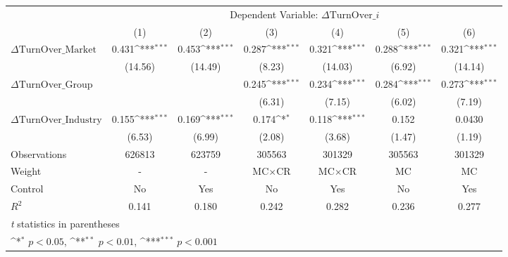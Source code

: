 {
\def\sym#1{\ifmmode^{#1}\else\(^{#1}\)\fi}
\begin{tabular}{l*{6}{c}}
\hline\hline
                    &\multicolumn{6}{c}{Dependent Variable: $\Delta \text{TurnOver}\_{i} $ }                                                             \\\cmidrule(lr){2-7}
                    &\multicolumn{1}{c}{(1)}         &\multicolumn{1}{c}{(2)}         &\multicolumn{1}{c}{(3)}         &\multicolumn{1}{c}{(4)}         &\multicolumn{1}{c}{(5)}         &\multicolumn{1}{c}{(6)}         \\
\hline
 $ \Delta \text{TurnOver}\_{\text{Market}} $ &       0.431\sym{***}&       0.453\sym{***}&       0.287\sym{***}&       0.321\sym{***}&       0.288\sym{***}&       0.321\sym{***}\\
                    &     (14.56)         &     (14.49)         &      (8.23)         &     (14.03)         &      (6.92)         &     (14.14)         \\
[1em]
 $ \Delta \text{TurnOver}\_{\text{Group}} $ &                     &                     &       0.245\sym{***}&       0.234\sym{***}&       0.284\sym{***}&       0.273\sym{***}\\
                    &                     &                     &      (6.31)         &      (7.15)         &      (6.02)         &      (7.19)         \\
[1em]
 $ \Delta \text{TurnOver}\_{\text{Industry}} $ &       0.155\sym{***}&       0.169\sym{***}&       0.174\sym{*}  &       0.118\sym{***}&       0.152         &      0.0430         \\
                    &      (6.53)         &      (6.99)         &      (2.08)         &      (3.68)         &      (1.47)         &      (1.19)         \\
\hline
Observations        &      626813         &      623759         &      305563         &      301329         &      305563         &      301329         \\
Weight              &           -         &           -         & $ \text{MC} \times \text{CR} $          & $ \text{MC} \times \text{CR} $          & $ \text{MC} $          & $ \text{MC} $          \\
Control             &          No         &         Yes         &          No         &         Yes         &          No         &         Yes         \\
$ R^2 $             &       0.141         &       0.180         &       0.242         &       0.282         &       0.236         &       0.277         \\
\hline\hline
\multicolumn{7}{l}{\footnotesize \textit{t} statistics in parentheses}\\
\multicolumn{7}{l}{\footnotesize \sym{*} \(p<0.05\), \sym{**} \(p<0.01\), \sym{***} \(p<0.001\)}\\
\end{tabular}
}
